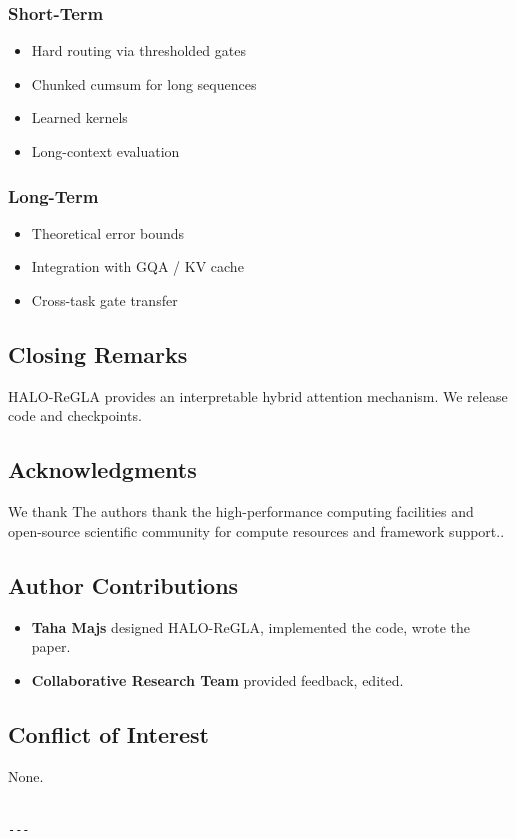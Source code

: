 \subsubsection{Short-Term}
\begin{itemize}
\item Hard routing via thresholded gates
\item Chunked cumsum for long sequences
\item Learned kernels
\item Long-context evaluation

\end{itemize}
\subsubsection{Long-Term}
\begin{itemize}
\item Theoretical error bounds
\item Integration with GQA / KV cache
\item Cross-task gate transfer

\end{itemize}
\subsection{Closing Remarks}

HALO-ReGLA provides an interpretable hybrid attention mechanism. We release 
code and checkpoints.

\subsection{Acknowledgments}

We thank The authors thank the high-performance computing facilities and open-source scientific community for compute resources and framework support..

\subsection{Author Contributions}

\begin{itemize}
\item \textbf{Taha Majs} designed HALO-ReGLA, implemented the code, wrote the paper.
\item \textbf{Collaborative Research Team} provided feedback, edited.

\end{itemize}
\subsection{Conflict of Interest}

None.
\begin{lstlisting}

---
\end{lstlisting}